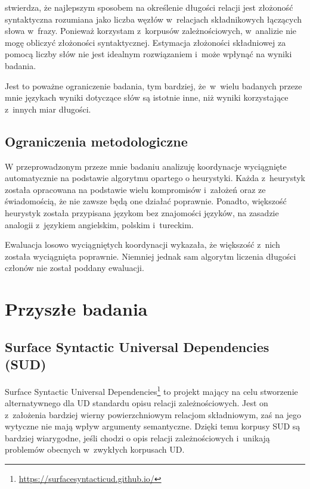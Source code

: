 \cite{lohmann2014english} stwierdza, że najlepszym sposobem na określenie długości relacji jest złożoność syntaktyczna rozumiana jako liczba węzłów w~relacjach składnikowych łączących słowa w~frazy. Ponieważ korzystam z~korpusów zależnościowych, w~analizie nie mogę obliczyć złożoności syntaktycznej. Estymacja złożoności składniowej za pomocą liczby słów nie jest idealnym rozwiązaniem i~może wpłynąć na wyniki badania.

Jest to poważne ograniczenie badania, tym bardziej, że~w~wielu badanych przeze mnie językach wyniki dotyczące słów są istotnie inne, niż wyniki korzystające z~innych miar długości.

\subsection{Ograniczenia metodologiczne}

W przeprowadzonym przeze mnie badaniu analizuję koordynacje wyciągnięte automatycznie na podstawie algorytmu opartego o heurystyki. Każda z~heurystyk została opracowana na podstawie wielu kompromisów i~założeń oraz ze świadomością, że nie zawsze będą one działać poprawnie. Ponadto, większość heurystyk została przypisana językom bez znajomości języków, na zasadzie analogii z~językiem angielskim, polskim i~tureckim.

Ewaluacja losowo wyciągniętych koordynacji wykazała, że większość z~nich została wyciągnięta poprawnie. Niemniej jednak sam algorytm liczenia długości członów nie został poddany ewaluacji.

\section{Przyszłe badania}

\subsection{Surface Syntactic Universal Dependencies (SUD)}

Surface Syntactic Universal Dependencies\footnote{
\url{https://surfacesyntacticud.github.io/}
} to projekt mający na celu stworzenie alternatywnego dla UD standardu opisu relacji zależnościowych. Jest on z~założenia bardziej wierny powierzchniowym relacjom składniowym, zaś na jego wytyczne nie mają wpływ argumenty semantyczne. Dzięki temu korpusy SUD są bardziej wiarygodne, jeśli chodzi o opis relacji zależnościowych i~unikają problemów obecnych w~zwykłych korpusach UD.

